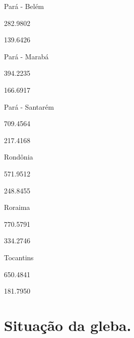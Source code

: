 \documentclass[
  letterpaper,
]{report}
\begin{document}
Pará - Belém

\n      

282.9802

\n      

139.6426

\n    

\n    

\n      

Pará - Marabá

\n      

394.2235

\n      

166.6917

\n    

\n    

\n      

Pará - Santarém

\n      

709.4564

\n      

217.4168

\n    

\n    

\n      

Rondônia

\n      

571.9512

\n      

248.8455

\n    

\n    

\n      

Roraima

\n      

770.5791

\n      

334.2746

\n    

\n    

\n      

Tocantins

\n      

650.4841

\n      

181.7950

\n    

\n  

\n


\hypertarget{situauxe7uxe3o-da-gleba.}{%
\chapter{Situação da gleba.}\label{situauxe7uxe3o-da-gleba.}}
\end{document}
